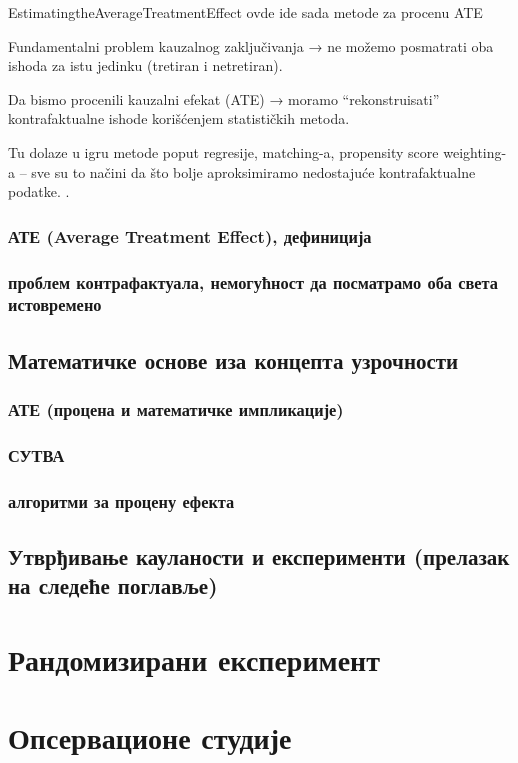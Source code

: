 \documentclass[12pt, a4paper]{article}
\begin{document}
 EstimatingtheAverageTreatmentEffect ovde ide sada metode za procenu ATE 

 Fundamentalni problem kauzalnog zaključivanja → ne možemo posmatrati oba ishoda za istu jedinku (tretiran i netretiran).

Da bismo procenili kauzalni efekat (ATE) → moramo “rekonstruisati” kontrafaktualne ishode korišćenjem statističkih metoda.

Tu dolaze u igru metode poput regresije, matching-a, propensity score weighting-a – sve su to načini da što bolje aproksimiramo 
nedostajuće kontrafaktualne podatke.
 .


    \subsubsection{АТЕ (Average Treatment Effect), дефиниција}
    \subsubsection{проблем контрафактуала, немогућност да посматрамо оба света истовремено}
\subsection{Математичке основе иза концепта узрочности}
    \subsubsection{АТЕ (процена и математичке импликације)}
    \subsubsection{СУТВА}
    \subsubsection{алгоритми за процену ефекта}
\subsection{Утврђивање кауланости и експерименти (прелазак на следеће поглавље)}

\newpage



\section{Рандомизирани експеримент}
\newpage



\section{Опсервационе студије}
\end{document}
